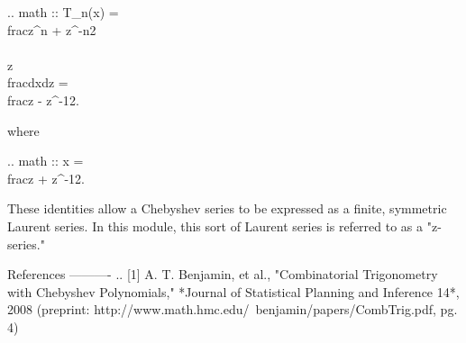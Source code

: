 \begin{DoxyVerb}
.. math ::
    T_n(x) = \\frac{z^n + z^{-n}}{2} \\\\
    z\\frac{dx}{dz} = \\frac{z - z^{-1}}{2}.

where

.. math :: x = \\frac{z + z^{-1}}{2}.

These identities allow a Chebyshev series to be expressed as a finite,
symmetric Laurent series.  In this module, this sort of Laurent series
is referred to as a "z-series."

References
----------
.. [1] A. T. Benjamin, et al., "Combinatorial Trigonometry with Chebyshev
  Polynomials," *Journal of Statistical Planning and Inference 14*, 2008
  (preprint: http://www.math.hmc.edu/~benjamin/papers/CombTrig.pdf, pg. 4)\end{DoxyVerb}
 

